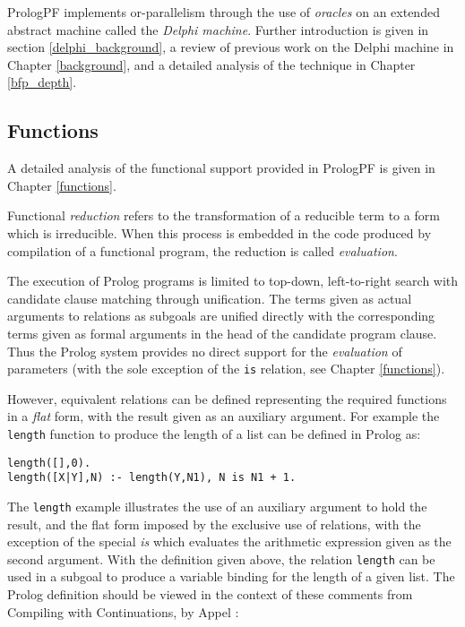 PrologPF implements or-parallelism through the use of \textit{oracles}
on an extended abstract machine called the \textit{Delphi machine}.
Further introduction is given in section \ref{delphi_background}, a
review of previous work on the Delphi machine in Chapter \ref{background},
and a detailed analysis of the technique in Chapter \ref{bfp_depth}.

\subsection{Functions}

A detailed analysis of the functional support provided in PrologPF is
given in Chapter \ref{functions}.

Functional \textit{reduction} refers to the transformation of a reducible
term to a form which is irreducible.  When this process is
embedded in the code produced by compilation of a functional program, the
reduction is called \textit{evaluation}.

The execution of Prolog programs is limited to top-down, left-to-right
search with candidate clause matching through unification.  The
terms given as actual arguments to relations as subgoals are unified 
directly with the corresponding terms given as formal arguments in the
head of the candidate program clause.  Thus the Prolog system provides no
direct
support for the \textit{evaluation} of parameters (with the sole exception
of the \texttt{is} relation, see Chapter \ref{functions}).

However, equivalent relations can be defined representing the required
functions in a \textit{flat} form, with the result given as an
auxiliary argument.  For example the \texttt{length} function to
produce the length of a list can
be defined in Prolog as:
\begin{verbatim}
length([],0).
length([X|Y],N) :- length(Y,N1), N is N1 + 1.
\end{verbatim}

The \texttt{length} example illustrates the use of an auxiliary argument to
hold the result, and the flat form imposed by the exclusive use of 
relations, with the exception of the special \textit{is} which evaluates the
arithmetic expression given as the second argument.  With the definition
given above, the relation \texttt{length} can be used in a subgoal to
produce a variable binding for the length of a given list.  The Prolog
definition should be viewed in the context of these comments from
Compiling with Continuations, by Appel \cite{App92}:

